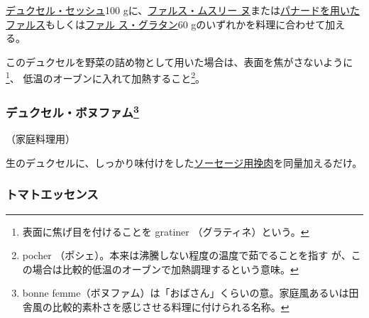 \begin{recette}
\protect\hyperlink{duxelles-seche}{デュクセル・セッシュ}100
gに、\protect\hyperlink{farce-c}{ファルス・ムスリー
ヌ}または\protect\hyperlink{farce-a}{パナードを用いたファルス}もしくは\protect\hyperlink{farce-gratin-a}{ファル
ス・グラタン}60 gのいずれかを料理に合わせて加える。

このデュクセルを野菜の詰め物として用いた場合は、表面を焦がさないように\footnote{表面に焦げ目を付けることを
  gratiner （グラティネ）という。}、
低温のオーブンに入れて加熱すること\footnote{pocher
  （ポシェ）。本来は沸騰しない程度の温度で茹でることを指す
  が、この場合は比較的低温のオーブンで加熱調理するという意味。}。

\maeaki

\hypertarget{duxelles-bonne-femme}{%
\subsubsection[デュクセル・ボヌファム]{\texorpdfstring{デュクセル・ボヌファム\footnote{bonne
  femme（ボヌファム）は「おばさん」くらいの意。家庭風あるいは田舎風の比較的素朴さを感じさせる料理に付けられる名称。}}{デュクセル・ボヌファム}}\label{duxelles-bonne-femme}}



（家庭料理用）

生のデュクセルに、しっかり味付けをした\protect\hyperlink{chair-a-saucisse}{ソーセージ用挽肉}を同量加えるだけ。

\maeaki

\hypertarget{essence-de-tomate}{%
\subsubsection{トマトエッセンス}\label{essence-de-tomate}}



\end{recette}
